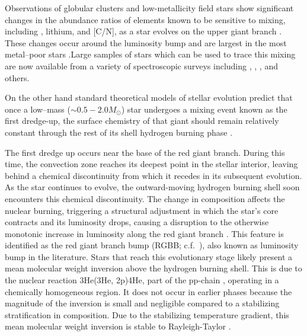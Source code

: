 %
%
%
Observations of globular clusters and low-metallicity field stars show significant changes in the abundance ratios of elements known to be sensitive to mixing, including \ctwelvecthirteen, lithium, and [C/N], as a star evolves on the upper giant branch \citep{Carbon1982, Pilachowski1986, Kraft1994, Shetrone2019}. 
These changes occur around the luminosity bump and are largest in the most metal--poor stars \citep[e.g.][]{Gratton2000}.Large samples of stars which can be used to trace this mixing are now available from a variety of spectroscopic surveys including \citep[GALAH,][]{buder2019}, \citep[APOGEE,][]{DR17}, \citep[GAIA-ESO,][]{Magrini2021b}, and others.

On the other hand standard theoretical models of stellar evolution predict that once a low--mass ($\sim 0.5 -2.0 M_{\odot}$) star undergoes a mixing event known as the first dredge-up, the surface chemistry of that giant should remain relatively constant through the rest of its shell hydrogen burning phase \citep[e.g][]{iben1964, Iben1967}. 

The first dredge up occurs near the base of the red giant branch. During this time, the convection zone reaches its deepest point in the stellar interior, leaving behind a chemical discontinuity from which it recedes in its subsequent evolution. %
As the star continues to evolve, the outward-moving hydrogen burning shell soon encounters this chemical discontinuity. The change in composition affects the nuclear burning, 
triggering a structural adjustment in which the star's core contracts and its luminosity drops, causing a disruption to the otherwise monotonic increase in luminosity along the red giant branch \citep{Christensen-Dalsgaard:2015}. This feature is identified as the red giant branch bump (RGBB; c.f.\ \citealt{Christensen-Dalsgaard:2015, Joyce2015, Khan2018}), also known as luminosity bump in the literature. Stars that reach this evolutionary stage likely present a mean molecular weight inversion above the hydrogen burning shell. This is due to the nuclear reaction 3He(3He, 2p)4He, part of the pp-chain  \citep{Ulrich_1972}, operating in a chemically homogeneous region. It does not occur in earlier phases because the magnitude of the inversion is small and negligible compared to a stabilizing stratification in composition.
Due to the stabilizing temperature gradient, this mean molecular weight inversion is stable to Rayleigh-Taylor \citep{CantielloLanger2010}. 

